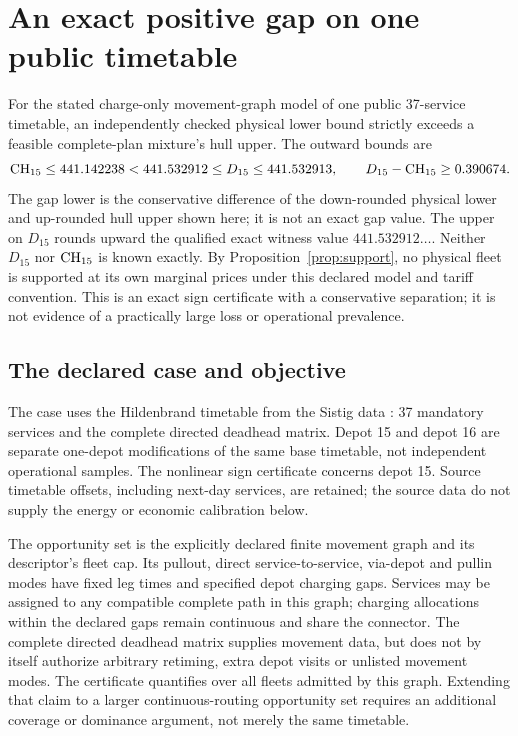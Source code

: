 \section{An exact positive gap on one public timetable}\label{sec:public}
For the stated charge-only movement-graph model of one public 37-service timetable, an
independently checked physical lower bound strictly exceeds a feasible
complete-plan mixture's hull upper. The outward bounds are
\begin{equation}\label{eq:publicbounds}
 \mathrm{CH}_{15}\le441.142238<441.532912\le D_{15}\le441.532913,
 \qquad D_{15}-\mathrm{CH}_{15}\ge0.390674.
\end{equation}
The gap lower is the conservative difference of the down-rounded physical
lower and up-rounded hull upper shown here; it is not an exact gap value.
The upper on $D_{15}$ rounds upward the qualified exact witness value
$441.532912\ldots$. Neither $D_{15}$ nor $\mathrm{CH}_{15}$ is known exactly.
By Proposition~\ref{prop:support}, no physical fleet is supported at its
own marginal prices under this declared model and tariff convention.
This is an exact sign certificate with a conservative separation; it
is not evidence of a practically large loss or operational prevalence.

\subsection{The declared case and objective}
The case uses the Hildenbrand timetable from the Sistig data
\citep{sistig2025dataset,sistig2025electrification}: 37 mandatory services
and the complete directed deadhead matrix. Depot 15 and depot 16 are
separate one-depot modifications of the same base timetable, not independent
operational samples. The nonlinear sign certificate concerns depot 15.
Source timetable offsets, including next-day services, are retained; the
source data do not supply the energy or economic calibration below.

The opportunity set is the explicitly declared finite movement graph and
its descriptor's fleet cap.
Its pullout, direct service-to-service, via-depot and pullin modes have
fixed leg times and specified depot charging gaps. Services may be assigned
to any compatible complete path in this graph; charging allocations within
the declared gaps remain continuous and share the connector. The complete
directed deadhead matrix supplies movement data, but does not by itself
authorize arbitrary retiming, extra depot visits or unlisted movement modes.
The certificate quantifies over all fleets admitted by this graph. Extending
that claim to a larger continuous-routing opportunity set requires an
additional coverage or dominance argument, not merely the same timetable.

